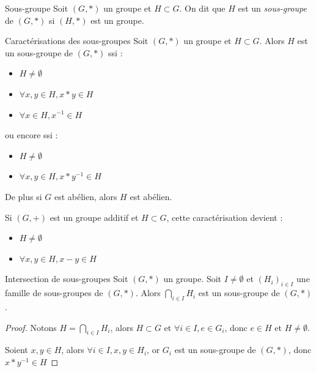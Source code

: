 \begin{definition}{Sous-groupe}{}
    Soit $(G, \ast)$ un groupe et $H \subset G$. On dit que $H$ est un \emph{sous-groupe} de
    $(G, \ast)$ si $(H, \ast)$ est un groupe.
\end{definition}

\begin{proposition}{Caractérisations des sous-groupes}{}
    Soit $(G, \ast)$ un groupe et $H \subset G$. 
    Alors $H$ est un sous-groupe de $(G, \ast)$ ssi :
    \begin{itemize}
        \item $H \neq \emptyset$
        \item $\forall x, y \in H, x \ast y \in H$ 
        \item $\forall x \in H, x^{-1} \in H$
    \end{itemize}
    ou encore ssi :
    \begin{itemize}
        \item $H \neq \emptyset$
        \item $\forall x, y \in H, x \ast y^{-1} \in H$
    \end{itemize}

    De plus si $G$ est abélien, alors $H$ est abélien.
\end{proposition}



\begin{remarque}
    Si $(G, +)$ est un groupe additif et $H \subset G$, cette caractérisation devient : 
    \begin{itemize}
        \item $H \neq \emptyset$
        \item $\forall x, y \in H, x - y \in H$
    \end{itemize}
\end{remarque}

\begin{theoreme}{Intersection de sous-groupes}{}
    Soit $(G, \ast)$ un groupe. Soit $I \neq \emptyset$ et 
    $(H_i)_{i \in I}$ une famille de sous-groupes de $(G, \ast)$.
    Alors $\displaystyle \bigcap_{i \in I} H_i$ est un sous-groupe de $(G, \ast)$.
\end{theoreme}

\begin{proof}
    Notons $H = \bigcap_{i \in I} H_i$, alors $H \subset G$ 
    et $\forall i \in I, e \in G_i$, donc $e \in H$ et $H \neq \emptyset$.

    Soient $x, y \in H$, alors $\forall i \in I, x, y \in H_i$, or 
    $G_i$ est un sous-groupe de $(G, \ast)$, donc $x \ast y^{-1} \in H$
\end{proof}

